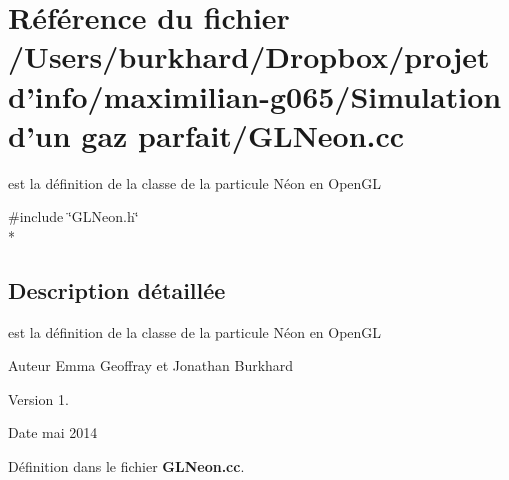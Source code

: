 \section{Référence du fichier /\+Users/burkhard/\+Dropbox/projet d'info/maximilian-\/g065/\+Simulation d'un gaz parfait/\+G\+L\+Neon.cc}
\label{_g_l_neon_8cc}


est la définition de la classe de la particule Néon en Open\+G\+L  


{\ttfamily \#include \char`\"{}G\+L\+Neon.\+h\char`\"{}}\\*


\subsection{Description détaillée}
est la définition de la classe de la particule Néon en Open\+G\+L 

\begin{DoxyAuthor}{Auteur}
Emma Geoffray et Jonathan Burkhard 
\end{DoxyAuthor}
\begin{DoxyVersion}{Version}
1. 
\end{DoxyVersion}
\begin{DoxyDate}{Date}
mai 2014 
\end{DoxyDate}


Définition dans le fichier {\bf G\+L\+Neon.\+cc}.

